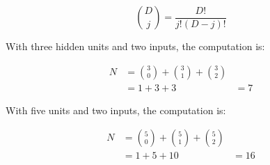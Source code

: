 \documentclass[12pt]{report}
\begin{document}
\begin{equation*}
    \binom{D}{j} = \frac{D!}{j!(D-j)!}
\end{equation*}

With three hidden units and two inputs, the computation is:

\begin{align*}
    N & = \binom{3}{0} + \binom{3}{1} + \binom{3}{2} \\
      & = 1 + 3 + 3
      & = 7
\end{align*}

With five units and two inputs, the computation is:

\begin{align*}
    N & = \binom{5}{0} + \binom{5}{1} + \binom{5}{2} \\
      & = 1 + 5 + 10
      & = 16
\end{align*}
\end{document}
